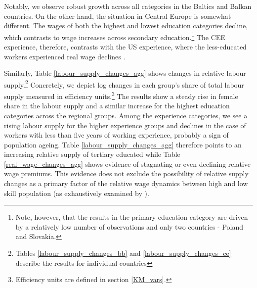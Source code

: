 \documentclass[11pt]{article}
\begin{document}
Notably, we observe robust growth across all categories in the Baltics and Balkan countries. On the other hand, the situation in Central Europe is somewhat different. The wages of both the highest and lowest education categories decline, which contrasts to wage increases across secondary education.\footnote{Note, however, that the results in the primary education category are driven by a relatively low number of observations and only two countries - Poland and Slovakia.} The CEE experience, therefore, contrasts with the US experience, where the less-educated workers experienced real wage declines \citep{acemoglu2011skills}.

Similarly, Table \ref{labour_supply_changes_agg} shows changes in relative labour supply.\footnote{Tables \ref{labour_supply_changes_bb} and \ref{labour_supply_changes_ce} describe the results for individual countries} Concretely, we depict log changes in each group's share of total labour supply measured in efficiency units.\footnote{Efficiency units are defined in section \ref{KM_vars}.} The results show a steady rise in female share in the labour supply and a similar increase for the highest education categories across the regional groups. Among the experience categories, we see a rising labour supply for the higher experience groups and declines in the case of workers with less than five years of working experience, probably a sign of population ageing.
Table \ref{labour_supply_changes_agg} therefore points to an increasing relative supply of tertiary educated while Table \ref{real_wage_changes_agg} shows evidence of stagnating or even declining relative wage premiums. This evidence does not exclude the possibility of relative supply changes as a primary factor of the relative wage dynamics between high and low skill population (as exhaustively examined by \citet{katz1992changes}).
\end{document}
